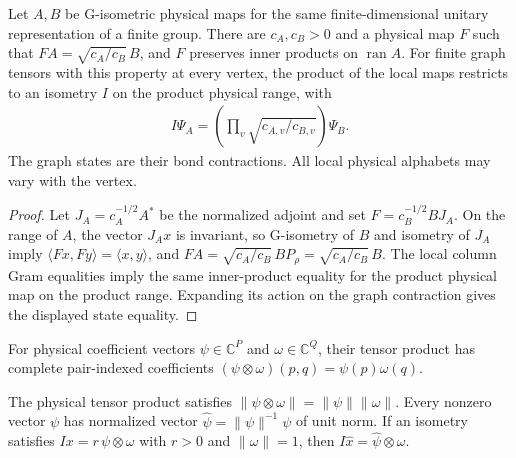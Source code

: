 
\begin{lemma}%
    \label{thm:peps_g_isometric_physical_transport}
    \leanok
    Let $A,B$ be G-isometric physical maps for the same finite-dimensional
    unitary representation of a finite group. There are $c_A,c_B>0$ and a
    physical map $F$ such that $FA=\sqrt{c_A/c_B}\,B$, and $F$ preserves
    inner products on $\operatorname{ran}A$. For finite graph tensors with
    this property at every vertex, the product of the local maps restricts
    to an isometry $I$ on the product physical range, with
    \begin{align}
        I\Psi_A=\left(\prod_v\sqrt{c_{A,v}/c_{B,v}}\right)\Psi_B.
    \end{align}
    The graph states are their bond contractions. All local physical
    alphabets may vary with the vertex.
\end{lemma}

\begin{proof}\leanok
    Let $J_A=c_A^{-1/2}A^*$ be the normalized adjoint and set
    $F=c_B^{-1/2}BJ_A$. On the range of $A$, the vector $J_Ax$ is invariant,
    so G-isometry of $B$ and isometry of $J_A$ imply
    $\langle Fx,Fy\rangle=\langle x,y\rangle$, and
    $FA=\sqrt{c_A/c_B}\,BP_\rho=\sqrt{c_A/c_B}\,B$.
    The local column Gram equalities imply the same inner-product equality
    for the product physical map on the product range. Expanding its action
    on the graph contraction gives the displayed state equality.
\end{proof}

\begin{definition}%
    \label{def:peps_physical_state_product}
    \leanok
    For physical coefficient vectors $\psi\in\mathbb C^P$ and
    $\omega\in\mathbb C^Q$, their tensor product has complete pair-indexed
    coefficients $(\psi\otimes\omega)(p,q)=\psi(p)\omega(q)$.
\end{definition}

\begin{lemma}%
    \label{thm:peps_physical_state_normalization}
    \leanok
    The physical tensor product satisfies
    $\|\psi\otimes\omega\|=\|\psi\|\|\omega\|$.
    Every nonzero vector $\psi$ has normalized vector
    $\widehat\psi=\|\psi\|^{-1}\psi$ of unit norm.
    If an isometry satisfies $Ix=r\,\psi\otimes\omega$ with $r>0$ and
    $\|\omega\|=1$, then $I\widehat x=\widehat\psi\otimes\omega$.
\end{lemma}


